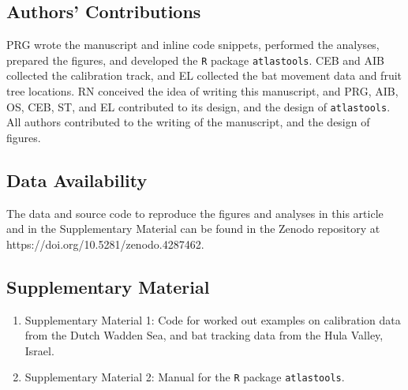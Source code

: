\documentclass[10pt,paper=a4,headings=standardclasses
]{scrartcl}
\begin{document}
\subsection{Authors' Contributions}

PRG wrote the manuscript and inline code snippets, performed the analyses, prepared the figures, and developed the \texttt{R} package \texttt{atlastools}.
CEB and AIB collected the calibration track, and EL collected the bat movement data and fruit tree locations.
RN conceived the idea of writing this manuscript, and PRG, AIB, OS, CEB, ST, and EL contributed to its design, and the design of \texttt{atlastools}.
All authors contributed to the writing of the manuscript, and the design of figures.

\subsection{Data Availability}

The data and source code to reproduce the figures and analyses in this article and in the Supplementary Material can be found in the Zenodo repository at https://doi.org/10.5281/zenodo.4287462.

\subsection{Supplementary Material}
\begin{enumerate}
    \item Supplementary Material 1: Code for worked out examples on calibration data from the Dutch Wadden Sea, and bat tracking data from the Hula Valley, Israel.
    \item Supplementary Material 2: Manual for the \texttt{R} package \texttt{atlastools}.
\end{enumerate}


\end{document}

